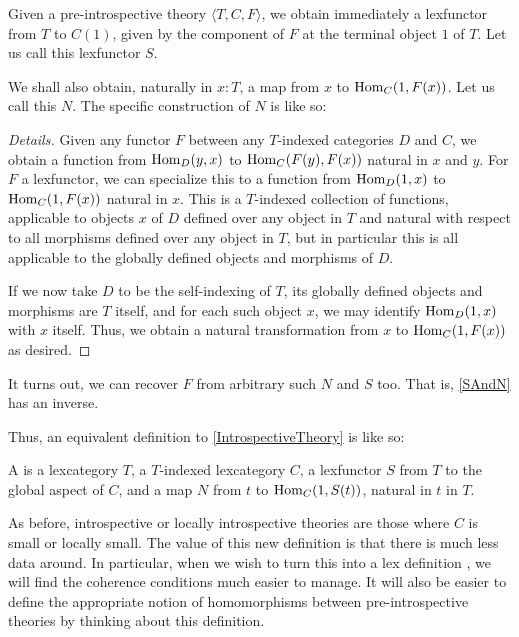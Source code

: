 \begin{construction}\label{SAndN}
Given a pre-introspective theory $\langle T, C, F \rangle$, we obtain immediately a lexfunctor from $T$ to $C(1)$, given by the component of $F$ at the terminal object $1$ of $T$. Let us call this lexfunctor $S$.

We shall also obtain, naturally in $x : T$, a map from $x$ to $\mathrm{Hom}_C(1, F(x))$. Let us call this $N$. The specific construction of $N$ is like so:
\end{construction}
\begin{proof}[Details]
Given any functor $F$ between any $T$-indexed categories $D$ and $C$, we obtain a function from $\mathrm{Hom}_D(y, x)$ to $\mathrm{Hom}_C(F(y), F(x))$ natural in $x$ and $y$. For $F$ a lexfunctor, we can specialize this to a function from $\mathrm{Hom}_D(1, x)$ to $\mathrm{Hom}_C(1, F(x))$ natural in $x$. This is a $T$-indexed collection of functions, applicable to objects $x$ of $D$ defined over any object in $T$ and natural with respect to all morphisms defined over any object in $T$, but in particular this is all applicable to the globally defined objects and morphisms of $D$.

If we now take $D$ to be the self-indexing of $T$, its globally defined objects and morphisms are $T$ itself, and for each such object $x$, we may identify $\mathrm{Hom}_D(1, x)$ with $x$ itself. Thus, we obtain a natural transformation from $x$ to $\mathrm{Hom}_C(1, F(x))$ as desired.
\end{proof}

It turns out, we can recover $F$ from arbitrary such $N$ and $S$ too. That is, \cref{SAndN} has an inverse. \TODO

Thus, an equivalent definition to \cref{IntrospectiveTheory} is like so:

\begin{definition}\label{IntrospectiveTheoryNS}
A  is a lexcategory $T$, a $T$-indexed lexcategory $C$, a lexfunctor $S$ from $T$ to the global aspect of $C$, and a map $N$ from $t$ to $\mathrm{Hom}_C(1, S(t))$, natural in $t$ in $T$.
\end{definition}

As before, introspective or locally introspective theories are those where $C$ is small or locally small. The value of this new definition is that there is much less data around. In particular, when we wish to turn this into a lex definition \TODO, we will find the coherence conditions much easier to manage. It will also be easier to define the appropriate notion of homomorphisms between pre-introspective theories by thinking about this definition.